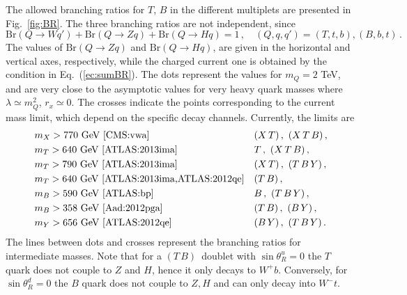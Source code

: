 \documentclass[12pt,a4paper]{article}
\newcommand{\tb}{$(T\,B)$}
\begin{document}
The allowed branching ratios for $T$, $B$ in the different multiplets are presented in Fig.~\ref{fig:BR}. 
The three branching ratios are not independent, since
\begin{equation}
\text{Br}(Q \to Wq') + \text{Br}(Q \to Zq) + \text{Br}(Q \to Hq) =1 \,,\quad (Q,q,q')=(T,t,b),(B,b,t) \,.
\label{ec:sumBR}
\end{equation}
The values of $\text{Br}(Q \to Zq)$ and $\text{Br}(Q \to Hq)$, are given in the horizontal and vertical axes, respectively, while the charged current one is obtained by the condition in Eq.~(\ref{ec:sumBR}). The dots represent the values for $m_Q = 2$ TeV, and are very close to the asymptotic values for very heavy quark masses where $\lambda \simeq m_Q^2$, $r_x \simeq 0$. The crosses indicate the points corresponding to the current mass limit, which depend on the specific decay channels. Currently, the limits are
\begin{align}
& m_X > 770~\text{GeV \cite{CMS:vwa}}  && (X\,T)\,,~(X\,T\,B) \,, \notag \\
& m_T > 640~\text{GeV \cite{ATLAS:2013ima}} && T\,,~(X\,T\,B) \,, \notag \\
& m_T > 790~\text{GeV \cite{ATLAS:2013ima}} && (X\,T)\,,~(T\,B\,Y) \,, \notag \\
& m_T > 640~\text{GeV \cite{ATLAS:2013ima,ATLAS:2012qe}} && (T\,B) \,, \notag \\
& m_B > 590~\text{GeV \cite{ATLAS:bp}} && B\,,~(T\,B\,Y) \,, \notag \\
& m_B > 358~\text{GeV \cite{Aad:2012pga}} && (T\,B)\,,~(B\,Y) \,, \notag \\
& m_Y > 656~\text{GeV \cite{ATLAS:2012qe}} && (B\,Y)\,,~(T\,B\,Y) \,.
\end{align}
The lines between dots and crosses represent the branching ratios for intermediate masses. Note that for a \tb\ doublet with $\sin \theta_R^u=0$ the $T$ quark does not couple to $Z$ and $H$, hence it only decays to $W^+b$. Conversely, for  $\sin \theta_R^d=0$ the $B$ quark does not couple to $Z,H$ and can only decay into $W^-t$.
%
\end{document}
